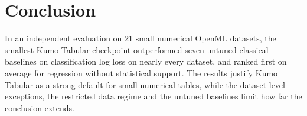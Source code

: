 \section{Conclusion}
\label{sec:conclusion}
In an independent evaluation on 21 small numerical OpenML datasets, the smallest Kumo Tabular checkpoint
outperformed seven untuned classical baselines on classification log loss on nearly every dataset, and ranked first on
average for regression without statistical support. The results justify Kumo Tabular as a strong default for small
numerical tables, while the dataset-level exceptions, the restricted data regime and the untuned baselines limit how
far the conclusion extends.
